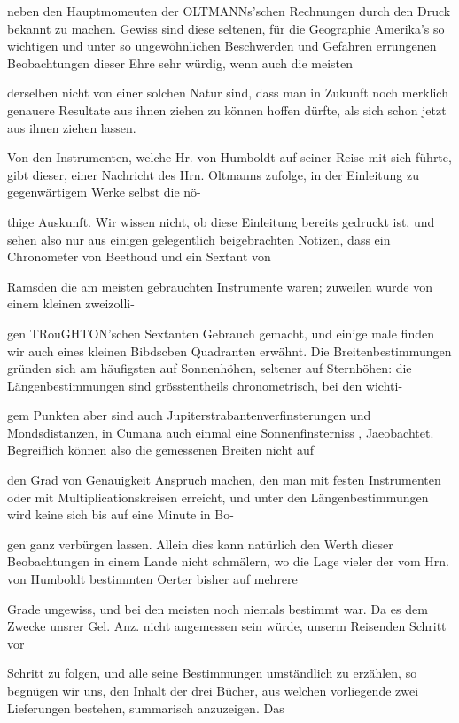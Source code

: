 \documentclass[10pt,a4paper]{article}
\begin{document}
neben den Hauptmomeuten der OLTMANNs'schen Rechnungen durch den Druck bekannt zu machen. Gewiss sind diese seltenen, für die Geographie Amerika's so wichtigen und unter so ungewöhnlichen Beschwerden und Gefahren errungenen Beobachtungen dieser Ehre sehr würdig, wenn auch die meisten

derselben nicht von einer solchen Natur sind, dass man in Zukunft noch merklich genauere Resultate aus ihnen ziehen zu können hoffen dürfte, als sich schon jetzt aus ihnen ziehen lassen.

Von den Instrumenten, welche Hr. von Humboldt auf seiner Reise mit sich führte, gibt dieser, einer Nachricht des Hrn. Oltmanns zufolge, in der Einleitung zu gegenwärtigem Werke selbst die nö-

thige Auskunft. Wir wissen nicht, ob diese Einleitung bereits gedruckt ist, und sehen also nur aus einigen gelegentlich beigebrachten Notizen, dass ein Chronometer von Beethoud und ein Sextant von

Ramsden die am meisten gebrauchten Instrumente waren; zuweilen wurde von einem kleinen zweizolli-

gen TRouGHTON'schen Sextanten Gebrauch gemacht, und einige male finden wir auch eines kleinen Bibdscben Quadranten erwähnt. Die Breitenbestimmungen gründen sich am häufigsten auf Sonnenhöhen, seltener auf Sternhöhen: die Längenbestimmungen sind grösstentheils chronometrisch, bei den wichti-

gem Punkten aber sind auch Jupiterstrabantenverfinsterungen und Mondsdistanzen, in Cumana auch einmal eine Sonnenfinsterniss , Jaeobachtet. Begreiflich können also die gemessenen Breiten nicht auf

den Grad von Genauigkeit Anspruch machen, den man mit festen Instrumenten oder mit Multiplicationskreisen erreicht, und unter den Längenbestimmungen wird keine sich bis auf eine Minute in Bo-

gen ganz verbürgen lassen. Allein dies kann natürlich den Werth dieser Beobachtungen in einem Lande nicht schmälern, wo die Lage vieler der vom Hrn. von Humboldt bestimmten Oerter bisher auf mehrere

Grade ungewiss, und bei den meisten noch niemals bestimmt war. Da es dem Zwecke unsrer Gel. Anz. nicht angemessen sein würde, unserm Reisenden Schritt vor

Schritt zu folgen, und alle seine Bestimmungen umständlich zu erzählen, so begnügen wir uns, den Inhalt der drei Bücher, aus welchen vorliegende zwei Lieferungen bestehen, summarisch anzuzeigen. Das
\end{document}
